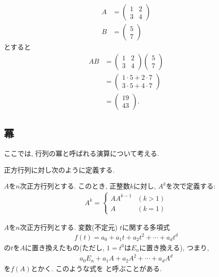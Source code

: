 \begin{example}
  \begin{align*}
    A&=\begin{pmatrix}1&2\\3&4\end{pmatrix}\\
    B&=\begin{pmatrix}5\\7\end{pmatrix}
  \end{align*}
  とすると
  \begin{align*}
    AB&=\begin{pmatrix}1&2\\3&4\end{pmatrix}\begin{pmatrix}5\\7\end{pmatrix}\\
      &=\begin{pmatrix}1\cdot 5+2\cdot 7\\
      3\cdot 5+4\cdot 7\end{pmatrix}\\
      &=\begin{pmatrix}19\\43\end{pmatrix}.
  \end{align*}
\end{example}

\subsection{冪}
ここでは, 行列の冪と呼ばれる演算について考える.

正方行列に対し次のように定義する.
\begin{definition}
  \label{def:op:pow}
  $A$を$n$次正方行列とする.
  このとき, 正整数$k$に対し, $A^k$を次で定義する:
  \begin{align*}
    A^k=
    \begin{cases}
      AA^{k-1} &(k>1)\\
      A&(k=1)
    \end{cases}
  \end{align*}
\end{definition}

\begin{definition}
  \label{def:mat:polynomial}
 $A$を$n$次正方行列とする.
  変数(不定元) $t$に関する多項式
  \begin{align*}
    f(t)=a_0+a_1t+a_2t^2+\cdots +a_dt^d
  \end{align*}
  の$t$を$A$に置き換えたもの(ただし, $1=t^0$は$E_n$に置き換える),
  つまり,
  \begin{align*}
    a_0E_n+a_1A+a_2A^2+\cdots +a_dA^d
  \end{align*}
  を$f(A)$とかく. このような式を
  と呼ぶことがある.
\end{definition}



